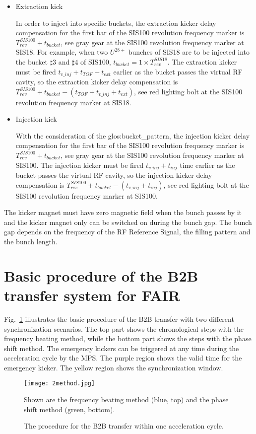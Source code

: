 \begin{itemize}
\item Extraction kick

In order to inject into specific buckets, the extraction kicker delay compensation for the first bar of the SIS100 revolution frequency marker is $T_{rev}^{SIS100} + t_{bucket}$, see gray gear at the SIS100 revolution frequency marker at SIS18. For example, when two $U^{28+}$ bunches of SIS18 are to be injected into the bucket $\sharp3$ and $\sharp4$ of SIS100, $t_{bucket} =1 \times T_{rev}^{SIS18}$. The extraction kicker must be fired $t_{v\_inj}+t_{TOF}+t_{ext}$ earlier as the bucket passes the virtual RF cavity, so the extraction kicker delay compensation is $T_{rev}^{SIS100} + t_{bucket} - (t_{TOF} + t_{v\_inj} + t_{ext})$, see red lighting bolt at the SIS100 revolution frequency marker at SIS18. 

\item Injection kick

With the consideration of the \gls{glos:bucket_pattern}, the injection kicker delay compensation for the first bar of the SIS100 revolution frequency marker is $T_{rev}^{SIS100} + t_{bucket}$, see gray gear at the SIS100 revolution frequency marker at SIS100. The injection kicker must be fired $t_{v\_inj}+t_{inj}$ time earlier as the bucket passes the virtual RF cavity, so the injection kicker delay compensation is $T_{rev}^{SIS100} + t_{bucket} - (t_{v\_inj} + t_{inj})$, see red lighting bolt at the SIS100 revolution frequency marker at SIS100.
\end{itemize}

The kicker magnet must have zero magnetic field when the bunch passes by it and the kicker magnet only can be switched on during the bunch gap. The bunch gap depends on the frequency of the RF Reference Signal, the filling pattern and the bunch length. 

\section{Basic procedure of the B2B transfer system for FAIR}

Fig.~\ref{2method} illustrates the basic procedure of the B2B transfer with two different synchronization scenarios. The top part shows the chronological steps with the frequency beating method, while the bottom part shows the steps with the phase shift method. The emergency kickers can be triggered at any time during the acceleration cycle by the MPS. The purple region shows the valid time for the emergency kicker. The yellow region shows the synchronization window. 
\begin{figure}[H]
   \centering   
   \texttt{[image: 2method.jpg]}
   \caption{The procedure for the B2B transfer within one acceleration cycle.}{Shown are the frequency beating method (blue, top) and the phase shift method (green, bottom).}
   \label{2method}
\end{figure}

